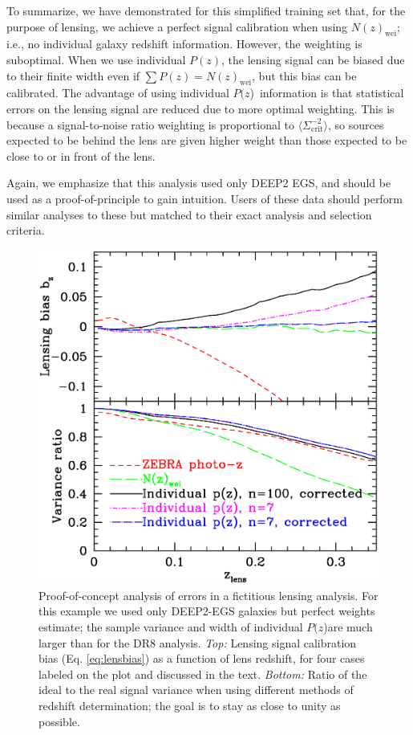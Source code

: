 \documentclass[preprint]{aastex}
\newcommand{\pofz}{$P(z$)}
\begin{document}
To summarize, we have demonstrated for this simplified training set that, for
the purpose of lensing, we achieve a perfect signal calibration when using
$N(z)_\mathrm{wei}$; i.e., no individual galaxy redshift information.  However,
the weighting is suboptimal.  When we use individual $P(z)$, the lensing signal
can be biased due to their finite width even if $\sum P(z) =
N(z)_\mathrm{wei}$, but this bias can be calibrated.  The advantage of
using individual \pofz\ information is that statistical errors on the lensing
signal are reduced due to more optimal weighting.  This is because a
signal-to-noise ratio weighting is proportional to $\langle \Sigma_{\mathrm{crit}}^{-2}
\rangle$, so sources expected to be behind the lens are given higher weight
than those expected to be close to or in front of the lens.

Again, we emphasize that this analysis used only DEEP2 EGS, and should be used
as a proof-of-principle to gain intuition.  Users of these data should perform
similar analyses to these but matched to their exact analysis and selection
criteria.

\begin{figure} [h]\centering
    \includegraphics[scale=0.5]{figures/pz.egs.c3n7.paper.ps}

    \caption{ Proof-of-concept analysis of errors in a fictitious lensing
    analysis.  For this example we used only DEEP2-EGS galaxies but perfect
    weights estimate; the sample variance and width of individual \pofz are
    much larger than for the DR8 analysis.  {\em Top:} Lensing signal
    calibration bias (Eq.  \ref{eq:lensbias}) as a function of lens redshift,
    for four  cases labeled on the plot and discussed in the text.  {\em
    Bottom:}  Ratio of the ideal to the real signal variance when using
    different  methods of redshift determination; the goal is to stay as close
    to unity as possible. \label{fig:simplebias}}

\end{figure}
\end{document}
